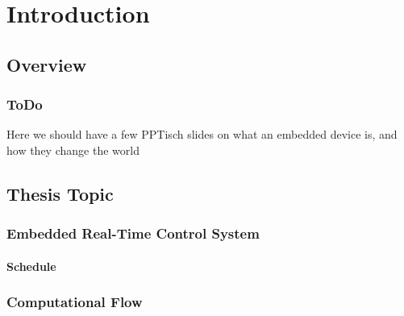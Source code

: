 \section{Introduction}%


\subsection{Overview}%


\begin{frame}
    \frametitle{ToDo}
    \centering
    \Huge
    Here we should have a few PPTisch slides on what an embedded device is, and how they change the world
\end{frame}


\subsection{Thesis Topic}%


\begin{frame}
    \frametitle{Embedded Real-Time Control System}
    \framesubtitle<7>{Schedule}
    \begin{figure}[h]
        \centering
        \only<2>{}%
        \only<3>{}%
        \only<8>{}%
        \only<9>{}%
    \end{figure}
\end{frame}


\begin{frame}
    \frametitle{Computational Flow}
    \begin{figure}[h]
        \centering
    \end{figure}
\end{frame}

